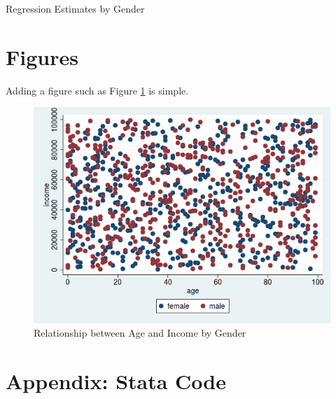 \documentclass[11pt, oneside]{article}   	%
\begin{document}
\begin{table}[htp]
  \centering
  
  \caption{Regression Estimates by Gender}
  \label{tab:reg-gender}
\end{table}

\section{Figures}

Adding a figure such as Figure \ref{fig:scatter} is simple. 

\begin{figure}[htp]
    \centering
    \includegraphics[scale=0.5]{test.png}
    \caption{Relationship between Age and Income by Gender}
    \label{fig:scatter}
\end{figure}



\newpage

\appendix

\section*{Appendix: Stata Code}

\end{document}
